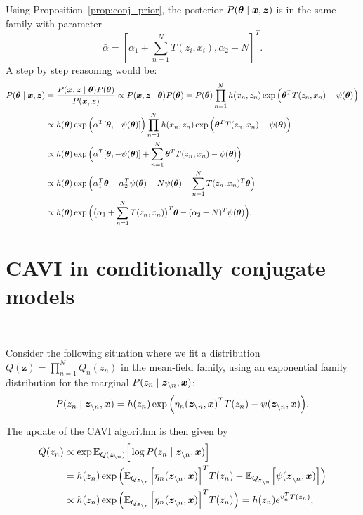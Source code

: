 Using Proposition~\ref{prop:conj_prior}, the posterior \(P(\bm{\theta} \mid \bm{x}, \bm{z})\) is in the same family with parameter
\[
  \bar{\alpha} = {[\alpha_{1} + \sum_{n=1}^{N} T(z_{i}, x_{i}), \alpha_{2}+ N]}^{T}.
\]
A step by step reasoning would be:
\[
  \begin{aligned}
    P(\bm{\theta} \mid \bm{x}, \bm{z}) &= \frac{P(\bm{x}, \bm{z} \mid \bm{\theta}) P(\bm{\theta})}{P(\bm{x}, \bm{z})} \propto  P(\bm{x}, \bm{z} \mid \bm{\theta}) P(\bm{\theta}) = P(\bm{\theta}) \prod_{n=1}^{N}h(x_{n}, z_{n})\exp \Big( \bm{\theta}^{T}T(z_{n}, x_{n})  - \psi(\bm{\theta}) \Big)\\
    &\propto  h(\bm{\theta}) \exp \Big( \alpha^{T}[\bm{\theta}, -\psi(\bm{\theta})]\Big)  \prod_{n=1}^{N}h(x_{n}, z_{n})\exp \Big( \bm{\theta}^{T}T(z_{n}, x_{n})  - \psi(\bm{\theta}) \Big)\\
    &\propto h(\bm{\theta}) \exp \Big(   \alpha^{T}[\bm{\theta}, -\psi(\bm{\theta})] + \sum_{n=1}^{N}  \bm{\theta}^{T}T(z_{n}, x_{n})  - \psi(\bm{\theta})  \Big)\\
    &\propto h(\bm{\theta}) \exp \Big(   \alpha_{1}^{T}\bm{\theta}  - \alpha_{2}^{T}\psi(\bm{\theta}) - N\psi(\bm{\theta}) + \sum_{n=1}^{N}  T(z_{n}, x_{n})^{T}\bm{\theta}  \Big)\\
    &\propto h(\bm{\theta}) \exp \Big(   \big(\alpha_{1} + \sum_{n=1}^{N}  T(z_{n}, x_{n})\big)^{T} \bm{\theta}  - (\alpha_{2} + N)^{T}\psi(\bm{\theta}) \Big).
  \end{aligned}
\]

\section{CAVI in conditionally conjugate models}~\label{sec:cavi_ccm}

Consider the following situation where we fit a distribution \(Q(\bm{z}) = \prod_{n=1}^{N} Q_{n}(z_{n})\) in the mean-field family, using an exponential family distribution for the marginal \(P(z_{n} \mid \bm{z}_{\backslash n}, \bm{x})\):
\[
  P(z_{n} \mid \bm{z}_{\backslash n}, \bm{x}) = h(z_{n})\exp \Big( {\eta_{n}(\bm{z}_{\backslash n}, \bm{x})}^{T}T(z_{n}) - \psi(\bm{z}_{\backslash n}, \bm{x}) \Big).
\]

The update of the CAVI algorithm  is then given by
  \begin{align}
    Q(z_{n}) &\propto \exp{\mathbb{E}_{Q(\bm{z}_{\backslash n})}\Big[\log P(z_{n} \mid \bm{z}_{\backslash n}, \bm{x})\Big]} \nonumber\\
    &= h(z_{n})\exp \Big(\mathbb{E}_{Q_{\bm{z}_{\backslash n}}}\Big[ {\eta_{n}(\bm{z}_{\backslash n}, \bm{x})}\Big]^{T}T(z_{n}) - \mathbb{E}_{Q_{\bm{z}_{\backslash n}}}\Big[ \psi(\bm{z}_{\backslash n}, \bm{x})\Big]\Big) \nonumber \\
    &\propto  h(z_{n})\exp \Big(\mathbb{E}_{Q_{\bm{z}_{\backslash n}}}\Big[ {\eta_{n}(\bm{z}_{\backslash n}, \bm{x})}\Big]^{T}T(z_{n})\Big) = h(z_{n})e^{v_{n}^{T}T(z_{n}) }, \label{eq:exponential_update}
  \end{align}

